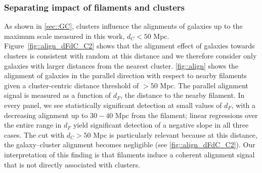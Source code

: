 \documentclass[usenatbib,useAMS]{mnras}
\theoremstyle{remark}
\newcommand{\rachel}[1]{{\textcolor{cyan}{RM: #1}}}
\newcommand{\jab}[1]{{\textcolor{red}{JAB: #1}}}
\begin{document}
\subsubsection{Separating impact of filaments and clusters}
As shown in \autoref{sec::GC}, clusters influence the alignments of galaxies up to the maximum scale
measured in this work, $d_C<50$ Mpc. Figure~\ref{fig::align_dFdC_C2} shows 
that the alignment effect of galaxies towards clusters is consistent with random at this distance 
and we therefore consider only galaxies with larger distances from the nearest cluster. 
\autoref{fig::align} shows the alignment of galaxies in the parallel direction with respect to
nearby filaments given a 
cluster-centric distance 
threshold of $>50$ Mpc.
 The parallel alignment signal is measured as a function of
$d_F$, the distance to the nearby filament.
In every panel, we see statistically significant detection at small values of $d_F$, with a
decreasing alignment up to $30-40$ Mpc from the filament; 
linear regressions over the entire range in $d_F$ yield significant detection of a negative slope in all three cases.
The cut with $d_C>50$ Mpc is particularly relevant because at this distance, the galaxy--cluster alignment becomes negligible (see \autoref{fig::align_dFdC_C2}).
Our interpretation of this finding is that filaments induce a coherent alignment signal that is not directly associated with clusters.
\end{document}
